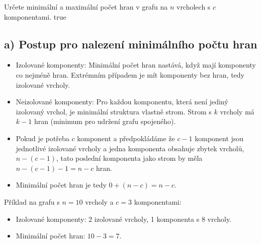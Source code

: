 \documentclass[10pt, a4paper]{ReportSheet}
\begin{document}
    \begin{uloha}{3}{2}{
        Určete minimální a maximální počet hran v grafu na $n$ vrcholech s $c$ komponentami.
    }{true}

        \subsection{a) Postup pro nalezení minimálního počtu hran}
        \label{subsec:ukol-2-3a-minimalni-pocet-hran}
        \begin{itemize}
            \item Izolované komponenty: Minimální počet hran nastává, když mají komponenty co nejméně hran. Extrémním
            případem je mít komponenty bez hran, tedy izolované vrcholy.
            \item Neizolované komponenty: Pro každou komponentu, která není jediný izolovaný vrchol, je minimální
            struktura vlastně strom. Strom s $k$ vrcholy má $k-1$ hran (minimum pro udržení grafu spojeného).
            \item Pokud je potřeba $c$ komponent a předpokládáme že $c-1$ komponent jsou jednotlivé izolované vrcholy a jedna komponenta obsahuje zbytek vrcholů, $n-(c-1)$, tato poslední komponenta jako strom by měla $n-(c-1)-1=n-c$ hran.
            \item Minimální počet hran je tedy $0 + (n-c) = n-c$.
        \end{itemize}

        Příklad na grafu s $n=10$ vrcholy a $c=3$ komponentami:
        \begin{itemize}
            \item Izolované komponenty: 2 izolované vrcholy, 1 komponenta s 8 vrcholy.
            \item Minimální počet hran: $10 - 3 = 7$.
        \end{itemize}



\end{uloha}
\end{document}

